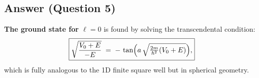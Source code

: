 \documentclass[12pt]{article}
\begin{document}
\subsection*{Answer (Question 5)}
\textbf{The ground state for $\ell=0$} is found by solving the transcendental condition:
\begin{equation}
\boxed{
\sqrt{\frac{V_0 + E}{-E}}\;=\;-\,\tan\Bigl(a\,\sqrt{\tfrac{2m}{\hbar^2}(V_0 + E)}\Bigr),
}
\end{equation}
which is fully analogous to the 1D finite square well but in spherical geometry.
\end{document}
